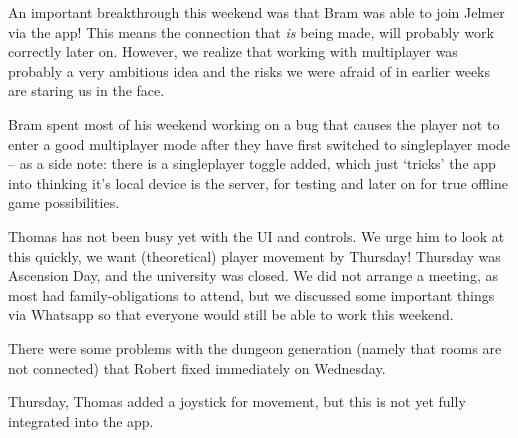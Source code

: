 \documentclass[../main.tex]{subfiles}
\begin{document}
An important breakthrough this weekend was that Bram was able to join Jelmer via the app! This means the connection that \textit{is} being made, will probably work correctly later on. However, we realize that working with multiplayer was probably a very ambitious idea and the risks we were afraid of in earlier weeks are staring us in the face.

Bram spent most of his weekend working on a bug that causes the player not to enter a good multiplayer mode after they have first switched to singleplayer mode -- as a side note: there is a singleplayer toggle added, which just `tricks' the app into thinking it's local device is the server, for testing and later on for true offline game possibilities.

Thomas has not been busy yet with the UI and controls. We urge him to look at this quickly, we want (theoretical) player movement by Thursday!
\bigbreak\noindent
Thursday was Ascension Day, and the university was closed. We did not arrange a meeting, as most had family-obligations to attend, but we discussed some important things via Whatsapp so that everyone would still be able to work this weekend.

There were some problems with the dungeon generation (namely that rooms are not connected) that Robert fixed immediately on Wednesday.

Thursday, Thomas added a joystick for movement, but this is not yet fully integrated into the app.
\end{document}
